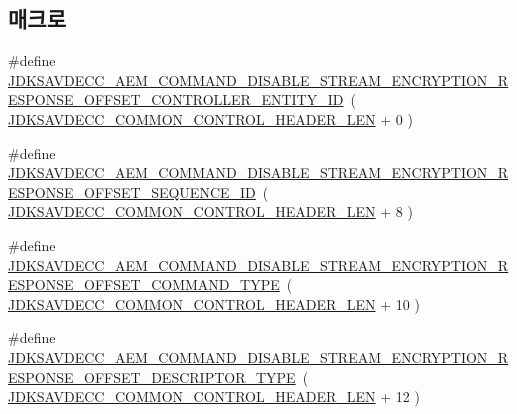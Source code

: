 \subsection*{매크로}
\begin{DoxyCompactItemize}
\item 
\#define \hyperlink{group__command__disable__stream__encryption__response_ga3ad14f638a9b8794d7bf8645f62c34da}{J\+D\+K\+S\+A\+V\+D\+E\+C\+C\+\_\+\+A\+E\+M\+\_\+\+C\+O\+M\+M\+A\+N\+D\+\_\+\+D\+I\+S\+A\+B\+L\+E\+\_\+\+S\+T\+R\+E\+A\+M\+\_\+\+E\+N\+C\+R\+Y\+P\+T\+I\+O\+N\+\_\+\+R\+E\+S\+P\+O\+N\+S\+E\+\_\+\+O\+F\+F\+S\+E\+T\+\_\+\+C\+O\+N\+T\+R\+O\+L\+L\+E\+R\+\_\+\+E\+N\+T\+I\+T\+Y\+\_\+\+ID}~( \hyperlink{group__jdksavdecc__avtp__common__control__header_gaae84052886fb1bb42f3bc5f85b741dff}{J\+D\+K\+S\+A\+V\+D\+E\+C\+C\+\_\+\+C\+O\+M\+M\+O\+N\+\_\+\+C\+O\+N\+T\+R\+O\+L\+\_\+\+H\+E\+A\+D\+E\+R\+\_\+\+L\+EN} + 0 )
\item 
\#define \hyperlink{group__command__disable__stream__encryption__response_ga6d09ce6e80feda639d96e2a9f99e1dfd}{J\+D\+K\+S\+A\+V\+D\+E\+C\+C\+\_\+\+A\+E\+M\+\_\+\+C\+O\+M\+M\+A\+N\+D\+\_\+\+D\+I\+S\+A\+B\+L\+E\+\_\+\+S\+T\+R\+E\+A\+M\+\_\+\+E\+N\+C\+R\+Y\+P\+T\+I\+O\+N\+\_\+\+R\+E\+S\+P\+O\+N\+S\+E\+\_\+\+O\+F\+F\+S\+E\+T\+\_\+\+S\+E\+Q\+U\+E\+N\+C\+E\+\_\+\+ID}~( \hyperlink{group__jdksavdecc__avtp__common__control__header_gaae84052886fb1bb42f3bc5f85b741dff}{J\+D\+K\+S\+A\+V\+D\+E\+C\+C\+\_\+\+C\+O\+M\+M\+O\+N\+\_\+\+C\+O\+N\+T\+R\+O\+L\+\_\+\+H\+E\+A\+D\+E\+R\+\_\+\+L\+EN} + 8 )
\item 
\#define \hyperlink{group__command__disable__stream__encryption__response_gace766c7fc9d857ba75e46b717f04f59b}{J\+D\+K\+S\+A\+V\+D\+E\+C\+C\+\_\+\+A\+E\+M\+\_\+\+C\+O\+M\+M\+A\+N\+D\+\_\+\+D\+I\+S\+A\+B\+L\+E\+\_\+\+S\+T\+R\+E\+A\+M\+\_\+\+E\+N\+C\+R\+Y\+P\+T\+I\+O\+N\+\_\+\+R\+E\+S\+P\+O\+N\+S\+E\+\_\+\+O\+F\+F\+S\+E\+T\+\_\+\+C\+O\+M\+M\+A\+N\+D\+\_\+\+T\+Y\+PE}~( \hyperlink{group__jdksavdecc__avtp__common__control__header_gaae84052886fb1bb42f3bc5f85b741dff}{J\+D\+K\+S\+A\+V\+D\+E\+C\+C\+\_\+\+C\+O\+M\+M\+O\+N\+\_\+\+C\+O\+N\+T\+R\+O\+L\+\_\+\+H\+E\+A\+D\+E\+R\+\_\+\+L\+EN} + 10 )
\item 
\#define \hyperlink{group__command__disable__stream__encryption__response_ga27c81c1fb1cb51ecb1d0b5dd451d2ffd}{J\+D\+K\+S\+A\+V\+D\+E\+C\+C\+\_\+\+A\+E\+M\+\_\+\+C\+O\+M\+M\+A\+N\+D\+\_\+\+D\+I\+S\+A\+B\+L\+E\+\_\+\+S\+T\+R\+E\+A\+M\+\_\+\+E\+N\+C\+R\+Y\+P\+T\+I\+O\+N\+\_\+\+R\+E\+S\+P\+O\+N\+S\+E\+\_\+\+O\+F\+F\+S\+E\+T\+\_\+\+D\+E\+S\+C\+R\+I\+P\+T\+O\+R\+\_\+\+T\+Y\+PE}~( \hyperlink{group__jdksavdecc__avtp__common__control__header_gaae84052886fb1bb42f3bc5f85b741dff}{J\+D\+K\+S\+A\+V\+D\+E\+C\+C\+\_\+\+C\+O\+M\+M\+O\+N\+\_\+\+C\+O\+N\+T\+R\+O\+L\+\_\+\+H\+E\+A\+D\+E\+R\+\_\+\+L\+EN} + 12 )

\end{DoxyCompactItemize}
